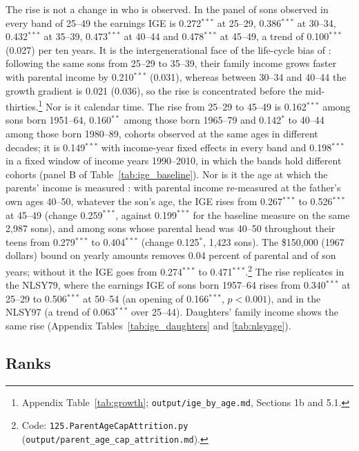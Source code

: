 

The rise is not a change in who is observed. In the panel of sons observed in every band of 25--49 the earnings IGE is
0.272$^{***}$ at 25--29, 0.386$^{***}$ at 30--34, 0.432$^{***}$ at 35--39, 0.473$^{***}$ at 40--44 and 0.478$^{***}$ at
45--49, a trend of 0.100$^{***}$ (0.027) per ten years. It is the intergenerational face of the life-cycle bias of
\citet{haider2006life}: following the same sons from 25--29 to 35--39, their family income grows faster with parental
income by 0.210$^{***}$ (0.031), whereas between 30--34 and 40--44 the growth gradient is 0.021 (0.036), so the rise is
concentrated before the mid-thirties.\footnote{Appendix Table~\ref{tab:growth}; \texttt{output/ige\_by\_age.md},
Sections 1b and 5.1.} Nor is it calendar time. The rise from 25--29 to 45--49 is 0.162$^{***}$ among sons born 1951--64,
0.160$^{**}$ among those born 1965--79 and 0.142$^{*}$ to 40--44 among those born 1980--89, cohorts observed at the same
ages in different decades; it is 0.149$^{***}$ with income-year fixed effects in every band and 0.198$^{***}$ in a fixed
window of income years 1990--2010, in which the bands hold different cohorts (panel B of Table~\ref{tab:ige_baseline}).
Nor is it the age at which the parents' income is measured \citep{nybom2016heterogeneous}: with parental income
re-measured at the father's own ages 40--50, whatever the son's age, the IGE rises from 0.267$^{***}$ to 0.526$^{***}$
at 45--49 (change 0.259$^{***}$, against 0.199$^{***}$ for the baseline measure on the same 2,987 sons), and among sons
whose parental head was 40--50 throughout their teens from 0.279$^{***}$ to 0.404$^{***}$ (change 0.125$^{*}$, 1,423
sons). The \$150,000 (1967 dollars) bound on yearly amounts removes 0.04 percent of parental and of son years; without
it the IGE goes from 0.274$^{***}$ to 0.471$^{***}$.\footnote{Code: \texttt{125.ParentAgeCapAttrition.py}
(\texttt{output/parent\_age\_cap\_attrition.md}).} The rise replicates in the NLSY79, where the earnings IGE of sons born 1957--64 rises from 0.340$^{***}$ at 25--29 to
0.506$^{***}$ at 50--54 (an opening of 0.166$^{***}$, $p<0.001$), and in the NLSY97 (a trend of 0.063$^{***}$ over
25--44). Daughters' family income shows the same rise (Appendix Tables~\ref{tab:ige_daughters} and \ref{tab:nlsyage}).



\subsection{Ranks}


